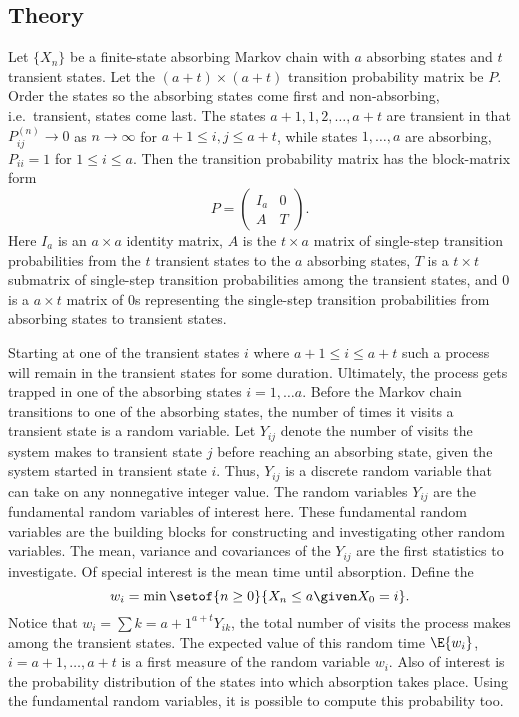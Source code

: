 \documentclass[12pt]{article}
\begin{document}
\subsection*{Theory}

Let \( \{ X_n \} \) be a finite-state absorbing Markov chain with \( a \)
absorbing states and \( t \) transient states.  Let the \( (a + t)
\times (a + t) \) transition probability matrix be \( P \).  Order the
states so the absorbing states come first and non-absorbing, i.e.\
transient, states come last.  The states
 \( a+1, 1, 2, \dots, a+t \) are transient in that
\( P^{(n)}_{ij} \to 0 \) as \( n \to \infty \) for
\( a+1 \le i,j \le a+t \), while states \( 1, \dots, a \) are absorbing,
\( P_{ii} = 1 \) for \( 1 \le i \le a \).
Then the transition probability matrix has the block-matrix form
\[
    P =
    \begin{pmatrix}
        I_a & 0 \\
        A & T
    \end{pmatrix}.
\]
Here \( I_{a} \) is an \( a \times a \) identity matrix, \( A \) is the \(
t \times a \) matrix of single-step transition probabilities from the \(
t \) transient states to the \( a \) absorbing states, \( T \) is a \( t
\times t \) submatrix of single-step transition probabilities among the
transient states, and \( 0 \) is a \( a \times t \) matrix of \( 0 \)s
representing the single-step transition probabilities from absorbing
states to transient states.

Starting at one of the transient states \( i \) where
\( a+1 \le i \le a+t \) such a process will remain in the transient states
for some duration.  Ultimately, the process gets trapped in one of the
absorbing states \( i = 1, \dots a \).  Before the Markov chain
transitions to one of the absorbing states, the number of times it
visits a transient state is a random variable.  Let \( Y_{ij} \)
denote the number of visits the system makes to transient state
\( j \) before reaching an absorbing state, given the system started
in transient state \( i \). Thus, \( Y_{ij} \) is a discrete random
variable that can take on any nonnegative integer value.  The random
variables \( Y_{ij} \) are the fundamental random variables of
interest here.  These fundamental random variables are the building blocks
for constructing and investigating other random variables.  The mean,
variance and covariances of the \( Y_{ij} \) are the first
statistics to investigate.  Of special interest is the mean time until
absorption.%
Define the %
\[
    w_i = \min \setof{n \ge 0}{X_n \le a \given X_0 = i}.
\] Notice that \( w_i = \sum{k=a+1}^{a+t} Y_{ik} \),
the total number of visits the process makes among the transient
states.
The expected value of this random time \( \E{w_i} \), \( i = a+1, \dots,
a+t \) is a first measure of the random variable \( w_i \). Also of
interest is the probability distribution of the states into which
absorption takes place.  Using the fundamental random variables, it is
possible to compute this probability too.
\end{document}
